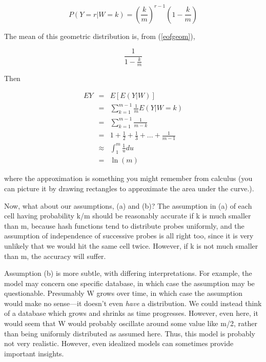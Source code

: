 \documentclass[11pt]{article}
\begin{document}
\begin{equation}
P(Y = r | W = k) = {(\frac{k}{m})}^{r-1} (1-\frac{k}{m})
\end{equation}

The mean of this geometric distribution is, from (\ref{eofgeom}),

\begin{equation} 
\frac{1}{1-\frac{k}{m}}
\end{equation}

Then 

\begin{eqnarray}
EY & = & E[E(Y|W)]\\
 & = & \sum ^{m-1}_{k=1}\frac{1}{m}E(Y|W=k)\\
 & = & \sum ^{m-1}_{k=1}\frac{1}{m-k}\\
 & = & 1+\frac{1}{2}+\frac{1}{3}+...+\frac{1}{m-1}\\
 & \approx  & \int_1^m \frac{1}{u} du \\
 & = & \ln(m)
\end{eqnarray}

where the approximation is something you might remember from calculus
(you can picture it by drawing rectangles to approximate the area under
the curve.).

Now, what about our assumptions, (a) and (b)?  The assumption in (a) of
each cell having probability k/m should be reasonably accurate if k is
much smaller than m, because hash functions tend to distribute probes
uniformly, and the assumption of independence of successive probes is
all right too, since it is very unlikely that we would hit the same cell
twice.  However, if k is not much smaller than m, the accuracy will
suffer.

Assumption (b) is more subtle, with differing interpretations.  For
example, the model may concern one specific database, in which case the
assumption may be questionable.  Presumably W grows over time, in which
case the assumption would make no sense---it doesn't even {\it have} a
distribution.  We could instead think of a database which grows and
shrinks as time progresses.  However, even here, it would seem that W
would probably oscillate around some value like m/2, rather than being
uniformly distributed as assumed here.  Thus, this model is probably not
very realistic.  However, even idealized models can sometimes provide
important insights.
\end{document}
